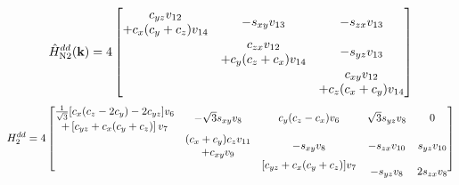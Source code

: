 \documentclass[twocolumn,showpacs,preprintnumbers,superscriptaddress,prb,floatfix,aps,10pt]{revtex4-1}
\renewcommand{\vec}[1]{\ensuremath{\mathbf{#1}}}
\newcommand*{\ham}{\hat{H}}
\begin{document}
\begin{widetext}
\begin{equation}
\end{equation}
%
\begin{equation}
\ham_{\textrm{N2}}^{dd}(\vec{k}) = 4
\begin{bmatrix}
              c_{yz} v_{12} & \multirow{2}{*}{$-s_{xy} v_{13}$} & \multirow{2}{*}{$-s_{zx} v_{13}$}  \\
+c_{x} (c_{y}+c_{z}) v_{14} &                                   &                                    \\
\multirow{2}{*}{ }          &               c_{zx} v_{12}       & \multirow{2}{*}{$-s_{yz} v_{13}$}  \\
                            & +c_{y} (c_{z}+c_{x}) v_{14}       &                                    \\
\multirow{2}{*}{ }          & \multirow{2}{*}{ }                &          c_{xy} v_{12}             \\ 
                            &                                   &        +c_{z} (c_{x}+c_{y}) v_{14} \\
\end{bmatrix}
\end{equation}
%
\begin{equation}
H_2^{dd} = 4
\begin{bmatrix}
 \tfrac{1}{\sqrt{3}} [c_{x} (c_{z}-2 c_{y})-2 c_{yz}] v_{6} & \multirow{2}{*}{$-\sqrt{3} s_{xy} v_{8}$} & \multirow{2}{*}{$c_{y} (c_{z}-c_{x}) v_{6}$}    & \multirow{2}{*}{$\sqrt{3} s_{yz} v_{8}$} & \multirow{2}{*}{$0$}               \\
             +\left[c_{yz}+c_{x} (c_{y}+c_{z})\right] v_{7} &                                           &                                                 &                                          &                                    \\
\multirow{2}{*}{ }                                          &      (c_{x}+c_{y}) c_{z} v_{11}           & \multirow{2}{*}{$-s_{xy} v_{8}$}                & \multirow{2}{*}{$-s_{zx} v_{10}$}        & \multirow{2}{*}{$ s_{yz} v_{10}$}  \\    
                                                            &                  +c_{xy} v_{9}            &                                                 &                                          &                                    \\
\multirow{2}{*}{ }                                          & \multirow{2}{*}{ }                        &     [c_{yz}+c_{x} (c_{y}+c_{z})] v_{7}          & \multirow{2}{*}{$-s_{yz} v_{8}$}         & \multirow{2}{*}{$2 s_{zx} v_{8}$}  \\ 

\end{bmatrix}
\end{equation}
\end{widetext}
\end{document}
